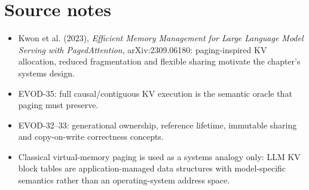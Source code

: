 \chapter*{Source notes}
\begin{itemize}
\item Kwon et al. (2023), \emph{Efficient Memory Management for Large Language Model Serving with PagedAttention}, arXiv:2309.06180: paging-inspired KV allocation, reduced fragmentation and flexible sharing motivate the chapter's systems design.
\item EVOD-35: full causal/contiguous KV execution is the semantic oracle that paging must preserve.
\item EVOD-32--33: generational ownership, reference lifetime, immutable sharing and copy-on-write correctness concepts.
\item Classical virtual-memory paging is used as a systems analogy only: LLM KV block tables are application-managed data structures with model-specific semantics rather than an operating-system address space.
\end{itemize}